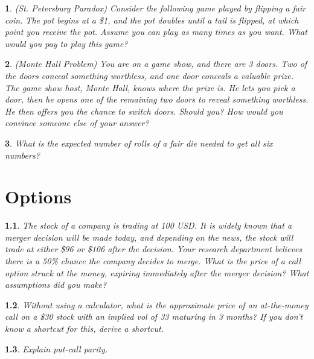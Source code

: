 \documentclass{report}
\newtheorem{problem}{}
\numberwithin{problem}{chapter} %
\begin{document}
\begin{problem}
(St. Petersburg Paradox) Consider the following game played by flipping a fair coin. The pot begins at a \$1, and the pot doubles until a tail is flipped, at which point you receive the pot. Assume you can play as many times as you want. What would you pay to play this game? 
\end{problem}

\begin{problem}
(Monte Hall Problem) You are on a game show, and there are 3 doors. Two of the doors conceal something worthless, and one door conceals a valuable prize. The game show host, Monte Hall, knows where the prize is. He lets you pick a door, then he opens one of the remaining two doors to reveal something worthless. He then offers you the chance to switch doors. Should you? How would you convince someone else of your answer?
\end{problem}

\begin{problem}
What is the expected number of rolls of a fair die needed to get all six numbers?
\end{problem}

\chapter{Options}

\begin{problem}
The stock of a company is trading at 100 USD. It is widely known that a merger decision will be made today, and depending on the news, the stock will trade at either \$96 or \$106 after the decision. Your research department believes there is a 50\% chance
        the company decides to merge. What is the price of a call option struck at the money, expiring immediately after the merger decision? What assumptions did you make?
\end{problem}

\begin{problem}
Without using a calculator, what is the approximate price of an at-the-money call on a \$30 stock with an implied vol of 33 maturing in 3 months? If you don't know a shortcut for this, derive a shortcut.
\end{problem}

\begin{problem}
Explain put-call parity.
\end{problem}
\end{document}
